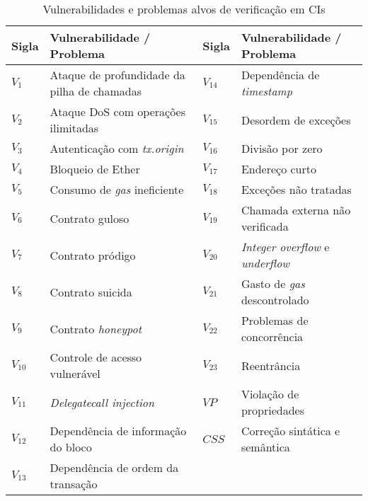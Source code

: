 \begin{table}[!ht]
\centering
\fontsize{8pt}{8pt}\selectfont
\caption{Vulnerabilidades e problemas alvos de verificação em CIs}
\label{tab:rq3-vulnerabilidades}
\begin{tabular}{@{}llll@{}}
\toprule
\textbf{Sigla} & \textbf{Vulnerabilidade / Problema} & \textbf{Sigla} & \textbf{Vulnerabilidade / Problema} \\ \midrule
$V_{1}$  & Ataque de profundidade da pilha de chamadas & $V_{14}$ & Dependência de \textit{timestamp}       \\
$V_{2}$  & Ataque DoS com operações ilimitadas         & $V_{15}$ & Desordem de exceções           \\
$V_{3}$  & Autenticação com \textit{tx.origin}                  & $V_{16}$ & Divisão por zero               \\
$V_{4}$  & Bloqueio de Ether                           & $V_{17}$ & Endereço curto                 \\
$V_{5}$  & Consumo de \textit{gas} ineficiente                  & $V_{18}$ & Exceções não tratadas          \\
$V_{6}$  & Contrato guloso                             & $V_{19}$ & Chamada externa não verificada \\
$V_{7}$  & Contrato pródigo                            & $V_{20}$ & \textit{Integer overflow} e \textit{underflow}   \\
$V_{8}$  & Contrato suicida                            & $V_{21}$ & Gasto de \textit{gas} descontrolado     \\
$V_{9}$  & Contrato \textit{honeypot}                           & $V_{22}$ & Problemas de concorrência      \\
$V_{10}$ & Controle de acesso vulnerável               & $V_{23}$ & Reentrância                    \\
$V_{11}$ & \textit{Delegatecall injection}             & $VP$  & Violação de propriedades       \\
$V_{12}$ & Dependência de informação do bloco          & $CSS$ & Correção sintática e semântica \\
$V_{13}$ & Dependência de ordem da transação           &       &                                \\ \bottomrule
\end{tabular}
\end{table}